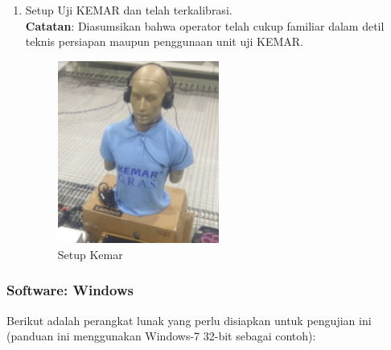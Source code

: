 \documentclass[12pt,]{article}
\begin{document}
\begin{enumerate}
		\newpage
		\item Setup Uji KEMAR dan telah terkalibrasi.\\
		\textbf{Catatan}: Diasumsikan bahwa operator telah cukup familiar dalam detil teknis persiapan
		maupun penggunaan unit uji KEMAR.
		\begin{figure}[!ht]
			\centering
			\includegraphics[width=150pt]{images/foto/kemar}
			\caption{Setup Kemar}
		\end{figure}
		
	\end{enumerate}
	
	\subsubsection{Software: Windows}
	
	Berikut adalah perangkat lunak yang perlu disiapkan untuk pengujian ini
	(panduan ini menggunakan Windows-7 32-bit sebagai contoh):
	
\end{document}
